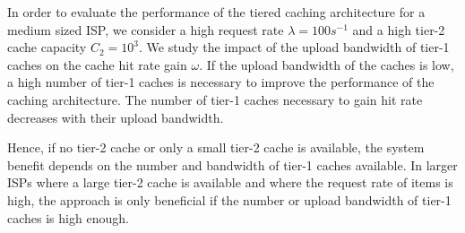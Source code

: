 In order to evaluate the performance of the tiered caching architecture for a medium sized ISP, we consider a high request rate $\lambda=100s^{-1}$ and a high tier-2 cache capacity $C_2=10^3$.
We study the impact of the upload bandwidth of tier-1 caches on the cache hit rate gain $\omega$.
If the upload bandwidth of the caches is low, a high number of tier-1 caches is necessary to improve the performance of the caching architecture.
The number of tier-1 caches necessary to gain hit rate decreases with their upload bandwidth.

Hence, if no tier-2 cache or only a small tier-2 cache is available, the system benefit depends on the number and bandwidth of tier-1 caches available.
In larger ISPs where a large tier-2 cache is available and where the request rate of items is high, the approach is only beneficial if the number or upload bandwidth of tier-1 caches is high enough.

